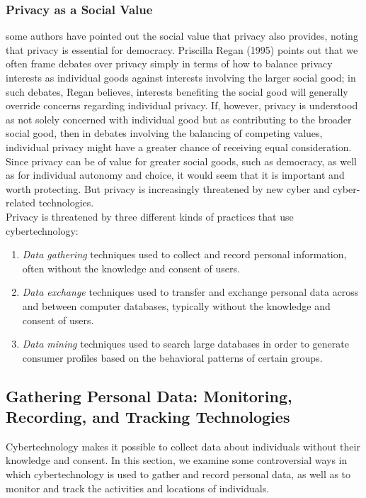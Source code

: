 \documentclass[12pt]{article}
\theoremstyle{definition}
\begin{document}
\subsubsection{Privacy as a Social Value}
some authors have pointed out the social value
that privacy also provides, noting that privacy is essential for democracy. Priscilla Regan (1995) points out that we often frame debates over privacy simply in terms of how to balance privacy interests as individual goods against interests involving the larger social good; in such debates, Regan believes, interests benefiting the social good will generally override concerns regarding individual privacy. If, however, privacy is understood as not solely concerned with individual good but as contributing to the broader social good, then in debates involving the balancing of competing values, individual privacy might have a greater chance of receiving equal consideration.\\
Since privacy can be of value for greater social goods, such as democracy, as well as for individual autonomy and choice, it would seem that it is important and worth protecting. But privacy is increasingly threatened by new cyber and cyber-related technologies.\\
Privacy is threatened by three different kinds of practices that use cybertechnology:
\begin{enumerate}
\item \textit{Data gathering} techniques used to collect and record personal information, often without the knowledge and consent of users.
\item \textit{Data exchange} techniques used to transfer and exchange personal data across and between computer databases, typically without the knowledge and consent of users.
\item \textit{Data mining} techniques used to search large databases in order to generate consumer profiles based on the behavioral patterns of certain groups.
\end{enumerate}
\subsection{Gathering Personal Data: Monitoring, Recording, and Tracking Technologies}
Cybertechnology makes it possible to collect data about individuals without their knowledge and consent. In this section, we examine some controversial ways in which cybertechnology is used to gather and record personal data, as well as to monitor and track the activities and locations of individuals.
\end{document}

